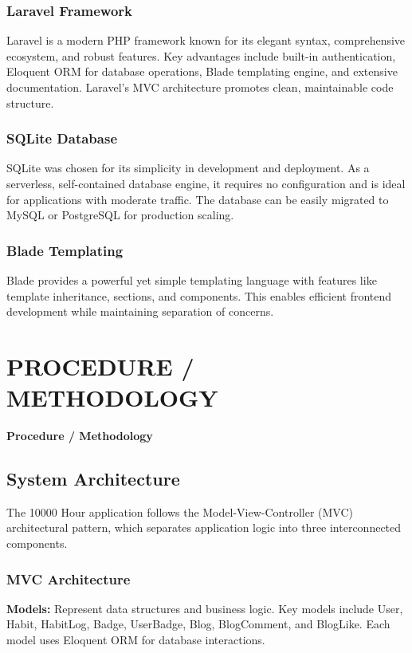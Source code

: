 \documentclass[12pt,a4paper]{report}
\newcommand{\JustifiedNormal}{\fontsize{12}{14}\selectfont\justifying\setlength{\parindent}{0pt}}
\begin{document}
\subsection{Laravel Framework}
\JustifiedNormal
Laravel is a modern PHP framework known for its elegant syntax, comprehensive ecosystem, and robust features. Key advantages include built-in authentication, Eloquent ORM for database operations, Blade templating engine, and extensive documentation. Laravel's MVC architecture promotes clean, maintainable code structure.

\subsection{SQLite Database}
\JustifiedNormal
SQLite was chosen for its simplicity in development and deployment. As a serverless, self-contained database engine, it requires no configuration and is ideal for applications with moderate traffic. The database can be easily migrated to MySQL or PostgreSQL for production scaling.

\subsection{Blade Templating}
\JustifiedNormal
Blade provides a powerful yet simple templating language with features like template inheritance, sections, and components. This enables efficient frontend development while maintaining separation of concerns.

\clearpage

\chapter{PROCEDURE / METHODOLOGY}
\begin{center}
  {\fontsize{14}{17}\selectfont\bfseries Procedure / Methodology}
\end{center}
\vspace{1em}

\section{System Architecture}
\JustifiedNormal
The 10000 Hour application follows the Model-View-Controller (MVC) architectural pattern, which separates application logic into three interconnected components.

\subsection{MVC Architecture}
\JustifiedNormal
\textbf{Models:} Represent data structures and business logic. Key models include User, Habit, HabitLog, Badge, UserBadge, Blog, BlogComment, and BlogLike. Each model uses Eloquent ORM for database interactions.
\end{document}
